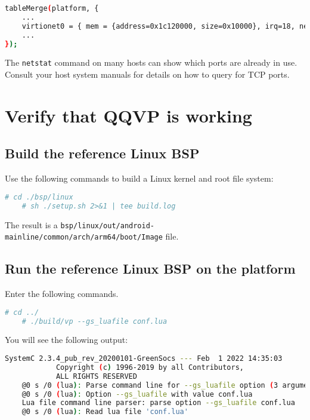 {\small
\begin{lstlisting}[language=bash]
tableMerge(platform, {
    ...
    virtionet0 = { mem = {address=0x1c120000, size=0x10000}, irq=18, netdev_str="type=user,hostfwd=tcp::2222-:22,hostfwd=tcp::2221-:21,hostfwd=tcp::9998-:1919"};
    ...
});
\end{lstlisting}
\normalsize

The {\small{\lstinline!netstat!}} command on many hosts can show which
ports are already in use. Consult your host system manuals for details
on how to query for TCP ports.

\clearpage
\section{Verify that QQVP is working}

\subsection{Build the reference Linux BSP}

Use the following commands to build a Linux kernel and root file system:

\small
\begin{lstlisting}[language=bash]
    # cd ./bsp/linux
    # sh ./setup.sh 2>&1 | tee build.log
\end{lstlisting}
\normalsize

The result is a {\small{\lstinline!bsp/linux/out/android-mainline/common/arch/arm64/boot/Image!}} file.



\subsection{Run the reference Linux BSP on the platform}

Enter the following commands.

\small
\begin{lstlisting}[language=bash]
    # cd ../
    # ./build/vp --gs_luafile conf.lua
\end{lstlisting}
\normalsize

You will see the following output:

\small
\begin{lstlisting}[language=bash]
            SystemC 2.3.4_pub_rev_20200101-GreenSocs --- Feb  1 2022 14:35:03
            Copyright (c) 1996-2019 by all Contributors,
            ALL RIGHTS RESERVED
    @0 s /0 (lua): Parse command line for --gs_luafile option (3 arguments)
    @0 s /0 (lua): Option --gs_luafile with value conf.lua
    Lua file command line parser: parse option --gs_luafile conf.lua
    @0 s /0 (lua): Read lua file 'conf.lua'


\end{lstlisting}}
